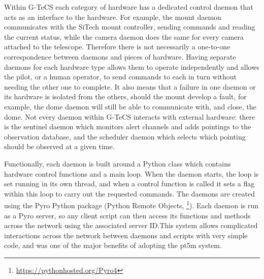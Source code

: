 \begin{colsection}
Within G-TeCS each category of hardware has a dedicated control daemon that acts as an interface to the hardware. For example, the mount daemon communicates with the SiTech mount controller, sending commands and reading the current status, while the camera daemon does the same for every camera attached to the telescope. Therefore there is not necessarily a one-to-one correspondence between daemons and pieces of hardware. Having separate daemons for each hardware type allows them to operate independently and allows the pilot, or a human operator, to send commands to each in turn without needing the other one to complete. It also means that a failure in one daemon or its hardware is isolated from the others, should the mount develop a fault, for example, the dome daemon will still be able to communicate with, and close, the dome. Not every daemon within G-TeCS interacts with external hardware: there is the sentinel daemon which monitors alert channels and adds pointings to the observation database, and the scheduler daemon which selects which pointing should be observed at a given time.

Functionally, each daemon is built around a Python class which contains hardware control functions and a main loop. When the daemon starts, the loop is set running in its own thread, and when a control function is called it sets a flag within this loop to carry out the requested commands. The daemons are created using the Pyro Python package (Python Remote Objects, \footnote{\url{https://pythonhosted.org/Pyro4}}). Each daemon is run as a Pyro server, so any client script can then access its functions and methods across the network using the associated server ID.\@ This system allows complicated interactions across the network between daemons and scripts with very simple code, and was one of the major benefits of adopting the pt5m system.

\end{colsection}


